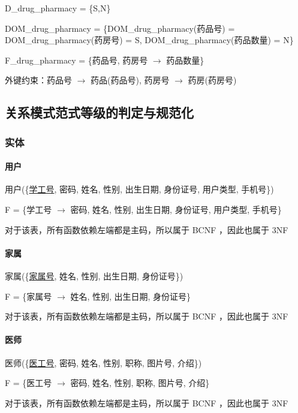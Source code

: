 \documentclass{article}
\begin{document}
D\_drug\_pharmacy = \{S,N\}

DOM\_drug\_pharmacy = \{DOM\_drug\_pharmacy(药品号) = DOM\_drug\_pharmacy(药房号) = S, \newline DOM\_drug\_pharmacy(药品数量) = N\}

F\_drug\_pharmacy = \{药品号, 药房号 $\rightarrow$ 药品数量\}

外键约束：药品号 $\rightarrow$ 药品(药品号), 药房号 $\rightarrow$ 药房(药房号)

\subsection{关系模式范式等级的判定与规范化}

\subsubsection{实体}

\paragraph{用户}

用户(\{\underline{学工号}, 密码, 姓名, 性别, 出生日期, 身份证号, 用户类型, 手机号\})

F = \{学工号 $\rightarrow$ 密码, 姓名, 性别, 出生日期, 身份证号, 用户类型, 手机号\}

对于该表，所有函数依赖左端都是主码，所以属于 BCNF ，因此也属于 3NF 

\paragraph{家属}

家属(\{\underline{家属号}, 姓名, 性别, 出生日期, 身份证号\})

F = \{家属号 $\rightarrow$ 姓名, 性别, 出生日期, 身份证号\}

对于该表，所有函数依赖左端都是主码，所以属于 BCNF ，因此也属于 3NF

\paragraph{医师}

医师(\{\underline{医工号}, 密码, 姓名, 性别, 职称, 图片号, 介绍\})

F = \{医工号 $\rightarrow$ 密码, 姓名, 性别, 职称, 图片号, 介绍\}

对于该表，所有函数依赖左端都是主码，所以属于 BCNF ，因此也属于 3NF
\end{document}
